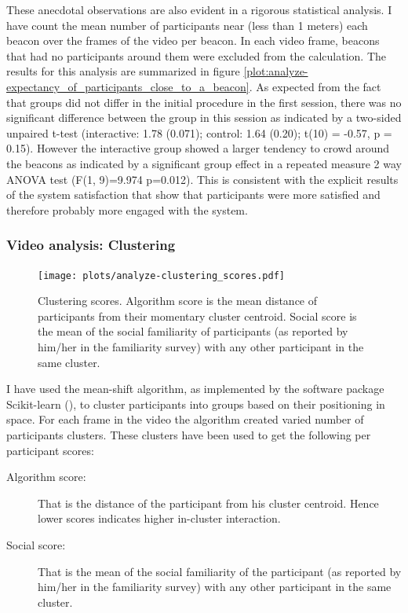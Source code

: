 \documentclass[a4paper,11pt]{article}
\begin{document}
{These anecdotal observations are also evident in a rigorous statistical analysis.
I have count the mean number of participants near (less than 1 meters) each beacon over the frames of the video per beacon.
In each video frame, beacons that had no participants around them were excluded from the calculation.
The results for this analysis are summarized in figure \ref{plot:analyze-expectancy_of_participants_close_to_a_beacon}.
As expected from the fact that groups did not differ in the initial procedure in the first session, there was no significant difference between the group in this session as indicated by a two-sided unpaired t-test (interactive: 1.78 (0.071); control: 1.64 (0.20); t(10) = -0.57, p = 0.15).
However the interactive group showed a larger tendency to crowd around the beacons as indicated by a significant group effect in a repeated measure 2 way ANOVA test (F(1, 9)=9.974 p=0.012).
This is consistent with the explicit results of the system satisfaction that show that participants were more satisfied and therefore probably more engaged with the system.

\subsubsection{Video analysis: Clustering}\label{results:clustering}

\begin{figure}[!htb]
    \centering
    \texttt{[image: plots/analyze-clustering\_scores.pdf]}
    \caption{Clustering scores. Algorithm score is the mean distance of participants from their momentary cluster centroid. Social score is the mean of the social familiarity of participants (as reported by him/her in the familiarity survey) with any other participant in the same cluster.}\label{plot:analyze-clustering_scores}
\end{figure}

I have used the mean-shift algorithm, as implemented by the software package Scikit-learn (\cite{scikit-learn}), to cluster participants into groups based on their positioning in space.
For each frame in the video the algorithm created varied number of participants clusters.
These clusters have been used to get the following per participant scores:

\begin{description}
    \item[Algorithm score:] That is the distance of the participant from his cluster centroid.
        Hence lower scores indicates higher in-cluster interaction. \label{results:algorithm_score}
    \item[Social score:] That is the mean of the social familiarity of the participant (as reported by him/her in the familiarity survey) with any other participant in the same cluster. \label{results:social_score}
\end{description}

}
\end{document}
